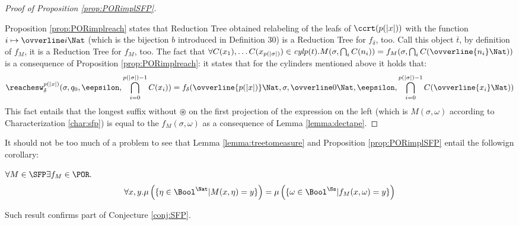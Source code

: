 \begin{conditional}{\notappendix}
\begin{proof}[Proof of Proposition \ref{prop:PORimplSFP}]
\begin{enumerate}
      \end{enumerate}
      Proposition \ref{prop:PORimplreach} states that Reduction Tree
      obtained relabeling of the leafs of
      $\ccrt(p(|x|))$ with the function $i \mapsto \ovverline i \Nat$
      (which is the bijection $b$ introduced in Definition 30) is a
      Reduction Tree for $f_\delta$, too.
      Call this object $\overline t$, by definition of $f_M$,
      it is a Reduction Tree for $f_M$, too.
      The fact that $\forall C(x_1), \ldots C(x_{p(|\sigma|)}) \in \mathit{cylp}(t).
      M(\sigma, \bigcap_i C(n_i))=f_M(\sigma, \bigcap_i C(\ovverline {n_i} \Nat))$
      is a consequence of Proposition \ref{prop:PORimplreach}: it states that
      for the cylinders mentioned above it holds that:
      \[
      \reachesw^{p(|x|)}_\delta(\sigma, q_0,\eepsilon, \bigcap_{i=0}^{p(|\sigma|)-1} C(x_i))=
      f_\delta(\ovverline {p(|x|)}\Nat, \sigma, \ovverline 0\Nat, \eepsilon,
       \bigcap_{i=0}^{p(|\sigma|)-1} C(\ovverline {x_i} \Nat) )
      \]
      This fact entails that the longest suffix without $\circledast$ on the first projection of the expression on the left
      (which is $M(\sigma, \omega)$ according to Characterization \ref{char:sfp})
      is equal to the $f_M(\sigma, \omega)$ as a consequence of Lemma
       \ref{lemma:dectape}.
    \end{proof}

    It should not be too much of a problem to see that
    Lemma \ref{lemma:treetomeasure} and Proposition \ref{prop:PORimplSFP} entail
    the followign corollary:

    \begin{cor}
      \label{cor:SFPtoPOR}
      $\forall M \in \SFP \exists f_M \in \POR.$
      $$
      \forall x, y.
                    \mu\left(\{\eta \in \Bool^\Nat| M(x, \eta)= y\}\right)=
                    \mu\left(\{\omega \in \Bool^\Ss| f_M(x, \omega)= y\}\right)
      $$
    \end{cor}

    Such result confirms part of Conjecture \ref{conj:SFP}.









\end{conditional}










